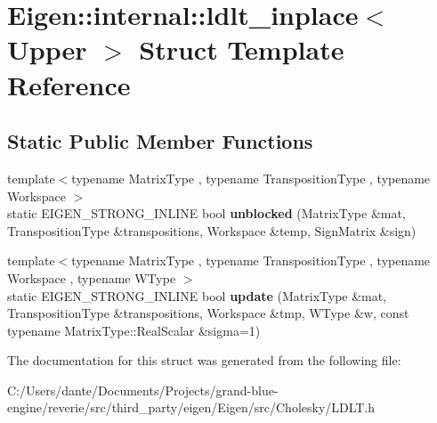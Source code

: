 \hypertarget{struct_eigen_1_1internal_1_1ldlt__inplace_3_01_upper_01_4}{}\section{Eigen\+::internal\+::ldlt\+\_\+inplace$<$ Upper $>$ Struct Template Reference}
\label{struct_eigen_1_1internal_1_1ldlt__inplace_3_01_upper_01_4}
\subsection*{Static Public Member Functions}
\begin{DoxyCompactItemize}
\item 
\mbox{\label{struct_eigen_1_1internal_1_1ldlt__inplace_3_01_upper_01_4_ae90ef00f0486fd2d84f8fd3b7b1fe3e3}} 
{\footnotesize template$<$typename Matrix\+Type , typename Transposition\+Type , typename Workspace $>$ }\\static E\+I\+G\+E\+N\+\_\+\+S\+T\+R\+O\+N\+G\+\_\+\+I\+N\+L\+I\+NE bool {\bfseries unblocked} (Matrix\+Type \&mat, Transposition\+Type \&transpositions, Workspace \&temp, Sign\+Matrix \&sign)
\item 
\mbox{\label{struct_eigen_1_1internal_1_1ldlt__inplace_3_01_upper_01_4_ac476b25dfc49b62b8351201cb06a7708}} 
{\footnotesize template$<$typename Matrix\+Type , typename Transposition\+Type , typename Workspace , typename W\+Type $>$ }\\static E\+I\+G\+E\+N\+\_\+\+S\+T\+R\+O\+N\+G\+\_\+\+I\+N\+L\+I\+NE bool {\bfseries update} (Matrix\+Type \&mat, Transposition\+Type \&transpositions, Workspace \&tmp, W\+Type \&w, const typename Matrix\+Type\+::\+Real\+Scalar \&sigma=1)
\end{DoxyCompactItemize}


The documentation for this struct was generated from the following file\+:\begin{DoxyCompactItemize}
\item 
C\+:/\+Users/dante/\+Documents/\+Projects/grand-\/blue-\/engine/reverie/src/third\+\_\+party/eigen/\+Eigen/src/\+Cholesky/L\+D\+L\+T.\+h\end{DoxyCompactItemize}
